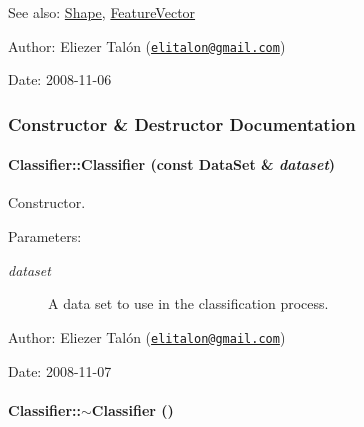 \begin{Desc}
\item[See also:]\hyperlink{class_shape}{Shape}, \hyperlink{class_feature_vector}{FeatureVector}\end{Desc}
\begin{Desc}
\item[Author:]Eliezer Talón (\href{mailto:elitalon@gmail.com}{\tt elitalon@gmail.com}) \end{Desc}
\begin{Desc}
\item[Date:]2008-11-06 \end{Desc}


\subsubsection{Constructor \& Destructor Documentation}
\hypertarget{class_classifier_9e4bb9d0578609751dfb7cffb77b804f}{
\paragraph[{Classifier}]{\setlength{\rightskip}{0pt plus 5cm}Classifier::Classifier (const {\bf DataSet} \& {\em dataset})}\hfill}
\label{class_classifier_9e4bb9d0578609751dfb7cffb77b804f}


Constructor. 

\begin{Desc}
\item[Parameters:]
\begin{description}
\item[{\em dataset}]A data set to use in the classification process.\end{description}
\end{Desc}
\begin{Desc}
\item[Author:]Eliezer Talón (\href{mailto:elitalon@gmail.com}{\tt elitalon@gmail.com}) \end{Desc}
\begin{Desc}
\item[Date:]2008-11-07 \end{Desc}
\hypertarget{class_classifier_7831f2accc6c1e98ba11ba5ee67f6d0c}{
\paragraph[{$\sim$Classifier}]{\setlength{\rightskip}{0pt plus 5cm}Classifier::$\sim$Classifier ()}\hfill}
\label{class_classifier_7831f2accc6c1e98ba11ba5ee67f6d0c}


